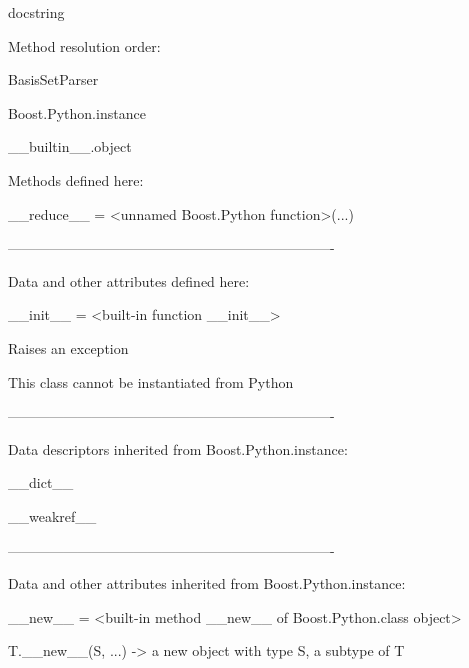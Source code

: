 \documentclass[letterpaper,10pt,english]{sphinxmanual}
\begin{document}
\begin{description}
\begin{description}
\item[{class BasisSetParser(Boost.Python.instance)}] \leavevmode
\begin{DUlineblock}{0em}
\item[] docstring
\item[] 
\item[] Method resolution order:
\item[]
\begin{DUlineblock}{\DUlineblockindent}
\item[] BasisSetParser
\item[] Boost.Python.instance
\item[] \_\_builtin\_\_.object
\item[] 
\end{DUlineblock}
\item[] Methods defined here:
\item[] 
\item[] \_\_reduce\_\_ = \textless{}unnamed Boost.Python function\textgreater{}(...)
\item[] 
\item[] ----------------------------------------------------------------------
\item[] Data and other attributes defined here:
\item[] 
\item[] \_\_init\_\_ = \textless{}built-in function \_\_init\_\_\textgreater{}
\item[]
\begin{DUlineblock}{\DUlineblockindent}
\item[] Raises an exception
\item[] This class cannot be instantiated from Python
\item[] 
\end{DUlineblock}
\item[] ----------------------------------------------------------------------
\item[] Data descriptors inherited from Boost.Python.instance:
\item[] 
\item[] \_\_dict\_\_
\item[] 
\item[] \_\_weakref\_\_
\item[] 
\item[] ----------------------------------------------------------------------
\item[] Data and other attributes inherited from Boost.Python.instance:
\item[] 
\item[] \_\_new\_\_ = \textless{}built-in method \_\_new\_\_ of Boost.Python.class object\textgreater{}
\item[]
\begin{DUlineblock}{\DUlineblockindent}
\item[] T.\_\_new\_\_(S, ...) -\textgreater{} a new object with type S, a subtype of T
\end{DUlineblock}
\end{DUlineblock}


\end{description}
\end{description}
\end{document}
